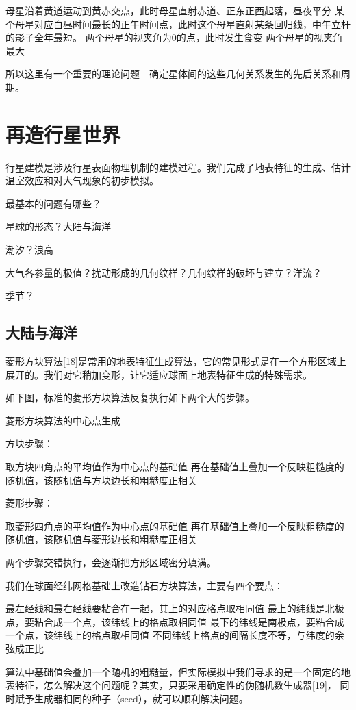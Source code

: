 \documentclass[a4paper,10.5pt]{book}
\begin{document}
母星沿着黄道运动到黄赤交点，此时母星直射赤道、正东正西起落，昼夜平分
某个母星对应白昼时间最长的正午时间点，此时这个母星直射某条回归线，中午立杆的影子全年最短。
两个母星的视夹角为0的点，此时发生食变
两个母星的视夹角最大

所以这里有一个重要的理论问题—确定星体间的这些几何关系发生的先后关系和周期。




\chapter{再造行星世界}

行星建模是涉及行星表面物理机制的建模过程。我们完成了地表特征的生成、估计温室效应和对大气现象的初步模拟。

最基本的问题有哪些？

星球的形态？大陆与海洋

潮汐？浪高

大气各参量的极值？扰动形成的几何纹样？几何纹样的破坏与建立？洋流？

季节？

\section{大陆与海洋}

菱形方块算法[18]是常用的地表特征生成算法，它的常见形式是在一个方形区域上展开的。我们对它稍加变形，让它适应球面上地表特征生成的特殊需求。

如下图，标准的菱形方块算法反复执行如下两个大的步骤。


菱形方块算法的中心点生成

方块步骤：

取方块四角点的平均值作为中心点的基础值
再在基础值上叠加一个反映粗糙度的随机值，该随机值与方块边长和粗糙度正相关

菱形步骤：

取菱形四角点的平均值作为中心点的基础值
再在基础值上叠加一个反映粗糙度的随机值，该随机值与菱形边长和粗糙度正相关

两个步骤交错执行，会逐渐把方形区域密分填满。

我们在球面经纬网格基础上改造钻石方块算法，主要有四个要点：

最左经线和最右经线要粘合在一起，其上的对应格点取相同值
最上的纬线是北极点，要粘合成一个点，该纬线上的格点取相同值
最下的纬线是南极点，要粘合成一个点，该纬线上的格点取相同值
不同纬线上格点的间隔长度不等，与纬度的余弦成正比

算法中基础值会叠加一个随机的粗糙量，但实际模拟中我们寻求的是一个固定的地表特征，怎么解决这个问题呢？其实，只要采用确定性的伪随机数生成器[19]，
同时赋予生成器相同的种子（seed），就可以顺利解决问题。
\end{document}
